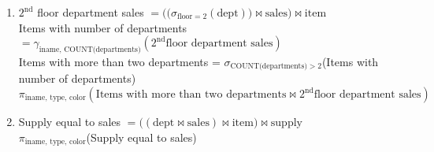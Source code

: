 \documentclass[12pt]{article}
\begin{document}
\begin{enumerate}
    \item $2^{\text{nd}}$ floor department sales $=\Big(\big(\sigma_{\text{floor}=2}(\text{dept})\big)\Join \text{sales}\Big) \Join \text{item}$\\
          Items with number of departments $= \gamma_{\text{iname, COUNT(departments)}}(2^{\text{nd}}\text{floor department sales})$\\
          Items with more than two departments = $\sigma_{\text{COUNT(departments)}>2}$(Items with number of departments)\\
          $\pi_{\text{iname, type, color}}(\text{Items with more than two departments} \Join 2^{\text{nd}}\text{floor department sales})$
    \item  %
          Supply equal to sales $=\big((\text{dept}\Join \text{sales}) \Join \text{item}\big) \Join \text{supply}$\\
          $\pi_{\text{iname, type, color}}$(Supply equal to sales)
\end{enumerate}
\end{document}
